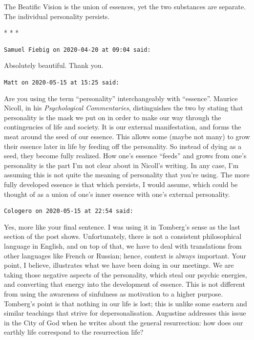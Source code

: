 The Beatific Vision is the union of essences, yet the two substances are separate. The individual personality persists.



\begin{center}* * *\end{center}

\begin{footnotesize}
\begin{sffamily}
\texttt{Samuel Fiebig on 2020-04-20 at 09:04 said:}

Absolutely beautiful. Thank you.

\hfill

\texttt{Matt on 2020-05-15 at 15:25 said:}

Are you using the term ``personality'' interchangeably with ``essence''. Maurice Nicoll, in his \textit{Psychological Commentaries}, distinguishes the two by stating that personality is the mask we put on in order to make our way through the contingencies of life and society. It is our external manifestation, and forms the meat around the seed of our essence. This allows some (maybe not many) to grow their essence later in life by feeding off the personality. So instead of dying as a seed, they become fully realized. How one's essence ``feeds'' and grows from one's personality is the part I'm not clear about in Nicoll's writing. In any case, I'm assuming this is not quite the meaning of personality that you're using. The more fully developed essence is that which persists, I would assume, which could be thought of as a union of one's inner essence with one's external personality.

\hfill

\texttt{Cologero on 2020-05-15 at 22:54 said:}

Yes, more like your final sentence. I was using it in Tomberg's sense as the last section of the post shows. Unfortunately, there is not a consistent philosophical language in English, and on top of that, we have to deal with translations from other languages like French or Russian; hence, context is always important. Your point, I believe, illustrates what we have been doing in our meetings. We are taking those negative aspects of the personality, which steal our psychic energies, and converting that energy into the development of essence. This is not different from using the awareness of sinfulness as motivation to a higher purpose. Tomberg's point is that nothing in our life is lost; this is unlike some eastern and similar teachings that strive for depersonalisation. Augustine addresses this issue in the City of God when he writes about the general resurrection: how does our earthly life correspond to the resurrection life?

\end{sffamily}
\end{footnotesize}

